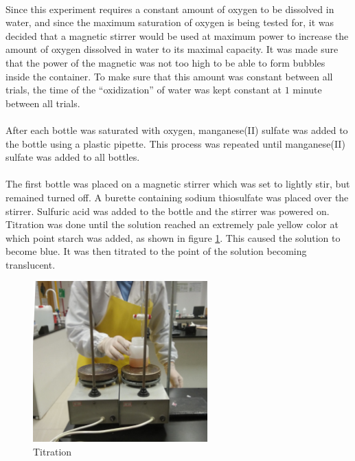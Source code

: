 \documentclass[a4paper]{article}
\begin{document}
\paragraph*{}
Since this experiment requires a constant amount of oxygen to be dissolved in
water, and since the maximum saturation of oxygen is being tested for, it was
decided that a magnetic stirrer would be used at maximum power to increase the
amount of oxygen dissolved in water to its maximal capacity. It was made sure
that the power of the magnetic was not too high to be able to form bubbles
inside the container. To make sure that this amount was constant between all
trials, the time of the ``oxidization'' of water was kept constant at $1$
minute between all trials.

\paragraph*{}
After each bottle was saturated with oxygen, manganese(II) sulfate was added to
the bottle using a plastic pipette. This process was repeated until
manganese(II) sulfate was added to all bottles.

\paragraph*{}
The first bottle was placed on a magnetic stirrer which was set to lightly
stir, but remained turned off. A burette containing sodium thiosulfate was
placed over the stirrer. Sulfuric acid was added to the bottle and the stirrer
was powered on. Titration was done until the solution reached an extremely pale
yellow color at which point starch was added, as shown in figure
\ref{fig:titration}. This caused the solution to become blue. It was then
titrated to the point of the solution becoming translucent.

\begin{figure}[ht]
  \centering
  \includegraphics[width=0.6\textwidth]{img/titration}
  \caption{Titration}
  \label{fig:titration}
\end{figure}
\end{document}
